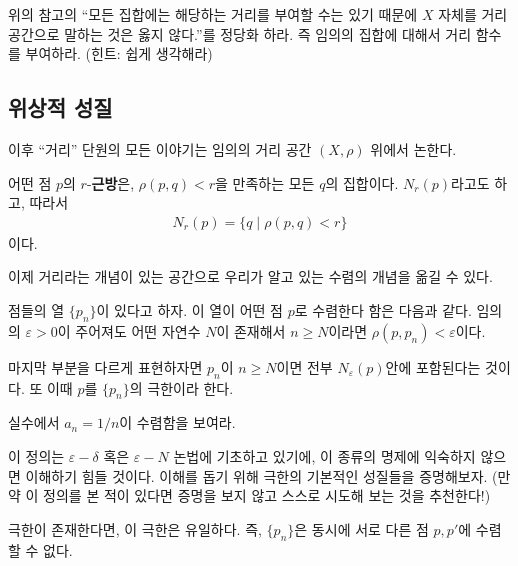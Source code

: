 \begin{exercise}
위의 참고의 ``모든 집합에는 해당하는 거리를 부여할 수는 있기 때문에 $X$ 자체를 거리 공간으로 말하는 것은 옳지 않다.''를 정당화 하라. 즉 임의의 집합에 대해서 거리 함수를 부여하라. (힌트: 쉽게 생각해라)
\end{exercise}

\subsection{위상적 성질}

이후 ``거리'' 단원의 모든 이야기는 임의의 거리 공간 $(X, \rho)$ 위에서 논한다.

\begin{definition}
    어떤 점 $p$의 $r$-\textbf{근방}은, $\rho(p, q) < r$을 만족하는 모든 $q$의 집합이다. 
    $N_r(p)$라고도 하고, 따라서
    \begin{align*}
        N_r(p) = \{ q \mid \rho(p, q) < r \}
    \end{align*}
    이다.
\end{definition}

이제 거리라는 개념이 있는 공간으로 우리가 알고 있는 수렴의 개념을 옮길 수 있다.

\begin{definition}
    점들의 열 $\{p_n\}$이 있다고 하자.
    이 열이 어떤 점 $p$로 수렴한다 함은 다음과 같다.
    임의의 $\varepsilon > 0$이 주어져도 어떤 자연수 $N$이 존재해서 $n \geq N$이라면 $\rho(p, p_n) < \varepsilon$이다.
    
    마지막 부분을 다르게 표현하자면 $p_n$이 $n \geq N$이면 전부 $N_\varepsilon(p)$안에 포함된다는 것이다.
    또 이때 $p$를 $\{p_n\}$의 극한이라 한다.
\end{definition}

\begin{exercise}
    실수에서 $a_n = 1 / n$이 수렴함을 보여라.
\end{exercise}

이 정의는 $\varepsilon-\delta$ 혹은 $\varepsilon-N$ 논법에 기초하고 있기에, 이 종류의 명제에 익숙하지 않으면 이해하기 힘들 것이다.
이해를 돕기 위해 극한의 기본적인 성질들을 증명해보자.
(만약 이 정의를 본 적이 있다면 증명을 보지 않고 스스로 시도해 보는 것을 추천한다!)

\begin{theorem}
    극한이 존재한다면, 이 극한은 유일하다.
    즉, $\{p_n\}$은 동시에 서로 다른 점 $p, p'$에 수렴할 수 없다.
\end{theorem}

